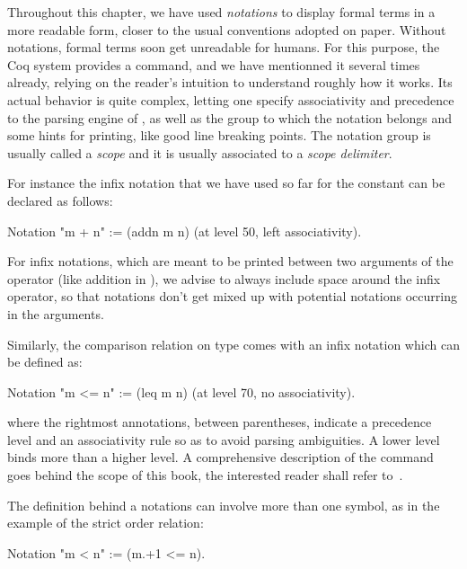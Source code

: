 Throughout this chapter, we have used \emph{notations} to display
formal terms in a more readable form, closer to the usual conventions
adopted on paper. Without notations, formal terms soon get unreadable for
humans. For this purpose, the Coq{} system provides a 
command, and we have mentionned it several times already,  relying on the
reader's intuition to understand roughly how it works. Its actual
behavior is quite complex, letting one specify associativity and
precedence to the parsing engine of \Coq{}, as well as the group to
which the notation belongs and some hints for printing, like good
line breaking points.  The notation group is usually called a
{\em scope} and it is usually associated to a {\em scope delimiter}.

For instance the infix notation that we have used so far for the
constant  can be declared as follows:

\begin{coq}{}{}
Notation "m + n" := (addn m n) (at level 50, left associativity).
\end{coq}

For infix notations, which are meant to be printed between two arguments
of the operator (like addition in ), we advise to always include
space around the infix operator, so that notations don't get mixed up with
potential notations occurring in the arguments.


Similarly, the comparison relation  on type  comes with
an infix notation \C{<=} which can be defined as:

\begin{coq}{}{}
Notation "m <= n" := (leq m n) (at level 70, no associativity).
\end{coq}

where the rightmost annotations, between parentheses, indicate a
precedence level and an associativity rule so as to avoid parsing
ambiguities. A lower level binds more than a higher level. A comprehensive
description of the  command goes behind the scope of this
book, the interested reader shall refer to~\cite[Chapter 12]{Coq:manual}.

The definition behind a notations can involve more than one symbol,
as in the example of the strict order relation:


\begin{coq}{}{}
Notation "m < n"  := (m.+1 <= n).
\end{coq}

